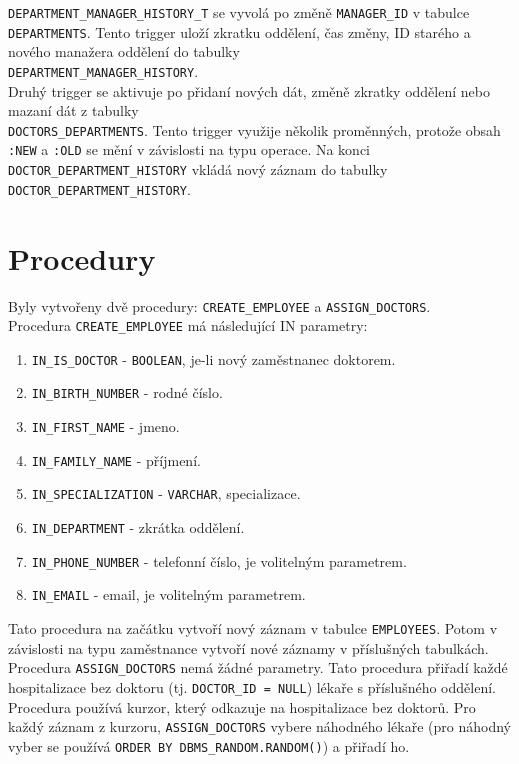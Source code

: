 \documentclass[a4paper,11pt]{article}
\begin{document}
\texttt{DEPARTMENT\_MANAGER\_HISTORY\_T} se vyvolá po změně \texttt{MANAGER\_ID} v tabulce \texttt{DEPARTMENTS}. Tento trigger uloží zkratku oddělení, čas změny, ID starého a nového manažera oddělení do tabulky\\ \texttt{DEPARTMENT\_MANAGER\_HISTORY}. \\

Druhý trigger se aktivuje po přidaní nových dát, změně zkratky oddělení nebo mazaní dát z tabulky \\ \texttt{DOCTORS\_DEPARTMENTS}. Tento trigger využije několik proměnných, protože obsah \texttt{:NEW} a \texttt{:OLD} se mění v závislosti na typu operace. Na konci \texttt{DOCTOR\_DEPARTMENT\_HISTORY} vkládá nový záznam do tabulky \texttt{DOCTOR\_DEPARTMENT\_HISTORY}.

\section{Procedury}
Byly vytvořeny dvě procedury: \texttt{CREATE\_EMPLOYEE} a \texttt{ASSIGN\_DOCTORS}. \\
Procedura \texttt{CREATE\_EMPLOYEE} má následující IN parametry:
\begin{enumerate}
    \item \texttt{IN\_IS\_DOCTOR} - \texttt{BOOLEAN}, je-li nový zaměstnanec doktorem.
    \item \texttt{IN\_BIRTH\_NUMBER} - rodné číslo.
    \item \texttt{IN\_FIRST\_NAME} - jmeno.
    \item \texttt{IN\_FAMILY\_NAME} - příjmení.
    \item \texttt{IN\_SPECIALIZATION} - \texttt{VARCHAR}, specializace.
    \item \texttt{IN\_DEPARTMENT} - zkrátka oddělení.
    \item \texttt{IN\_PHONE\_NUMBER} - telefonní číslo, je volitelným parametrem. 
    \item \texttt{IN\_EMAIL} - email, je volitelným parametrem.
\end{enumerate}
Tato procedura na začátku vytvoří nový záznam v tabulce \texttt{EMPLOYEES}. Potom v závislosti na typu zaměstnance vytvoří nové záznamy v příslušných tabulkách. \\

Procedura \texttt{ASSIGN\_DOCTORS} nemá žádné parametry. Tato procedura přiřadí každé hospitalizace bez doktoru (tj. \texttt{DOCTOR\_ID = NULL}) lékaře s příslušného oddělení. Procedura používá kurzor, který odkazuje na hospitalizace bez doktorů. Pro každý záznam z kurzoru, \texttt{ASSIGN\_DOCTORS} vybere náhodného lékaře (pro náhodný vyber se používá \texttt{ORDER BY DBMS\_RANDOM.RANDOM()}) a přiřadí ho. 
\end{document}
